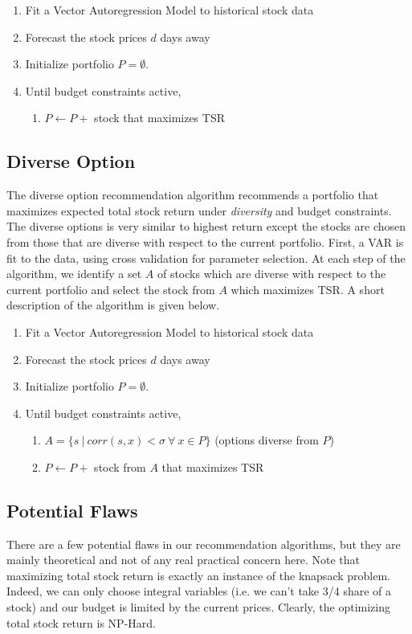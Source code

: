 \documentclass{article}
\begin{document}
\begin{enumerate}
	\item Fit a Vector Autoregression Model to historical stock data
	\item Forecast the stock prices $d$ days away
	\item Initialize portfolio $P = \emptyset$. 
	\item Until budget constraints active,
		\begin{enumerate}
			\item $P \leftarrow P +$ stock that maximizes TSR
		\end{enumerate}
\end{enumerate}

\subsection{Diverse Option}
The diverse option recommendation algorithm recommends a portfolio that maximizes expected total stock return under \emph{diversity} and budget constraints. The diverse options is very similar to highest return except the stocks are chosen from those that are diverse with respect to the current portfolio. First, a VAR is fit to the data, using cross validation for parameter selection. At each step of the algorithm, we identify a set $A$ of stocks which are diverse with respect to the current portfolio and select the stock from $A$ which maximizes TSR. A short description of the algorithm is given below.

\begin{enumerate}
	\item Fit a Vector Autoregression Model to historical stock data
	\item Forecast the stock prices $d$ days away
	\item Initialize portfolio $P = \emptyset$. 
	\item Until budget constraints active,
		\begin{enumerate}
			\item $A = \{s \ | \ corr(s,x) < \sigma \ \forall \ x \in P\}$ (options diverse from $P$)
			\item $P \leftarrow P +$ stock from $A$ that maximizes TSR
		\end{enumerate}
\end{enumerate}

\subsection{Potential Flaws}
There are a few potential flaws in our recommendation algorithms, but they are mainly theoretical and not of any real practical concern here. Note that maximizing total stock return is exactly an instance of the knapsack problem. Indeed, we can only choose integral variables (i.e. we can't take 3/4 share of a stock) and our budget is limited by the current prices. Clearly, the optimizing total stock return is NP-Hard. 
\end{document}
